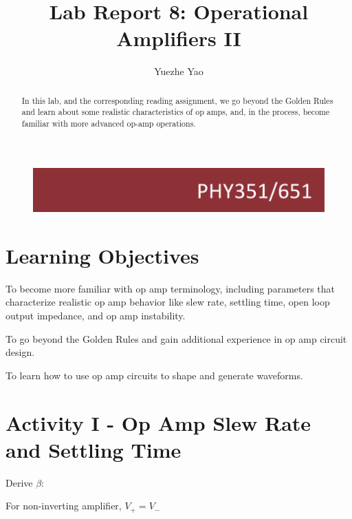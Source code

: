 \documentclass[11pt]{article}
\begin{document}
\begin{figure}
  \includegraphics[width=\linewidth/3]{title}
  \label{fig:title}
\end{figure}


\title{Lab Report 8: Operational Amplifiers II}


\author{Yuezhe Yao}




\maketitle

\begin{abstract}
In this lab, and the corresponding reading assignment, we go beyond the 
Golden Rules and learn about some realistic characteristics of op amps, and, in the process, become familiar with more advanced op-amp operations.     
\end{abstract}

\medskip

\begingroup
\let\clearpage\relax
\tableofcontents
\endgroup

\medskip
\medskip

\section{Learning Objectives}

To become more familiar with op amp terminology, including parameters that characterize realistic op amp behavior like slew rate, settling time, open loop output impedance, and op amp instability.

To go beyond the Golden Rules and gain additional experience in op amp circuit design.

To learn how to use op amp circuits to shape and generate waveforms.

\section{Activity I - Op Amp Slew Rate and Settling Time}

Derive $\beta$:

For non-inverting amplifier, $V_{+}=V_{-}$
\end{document}
